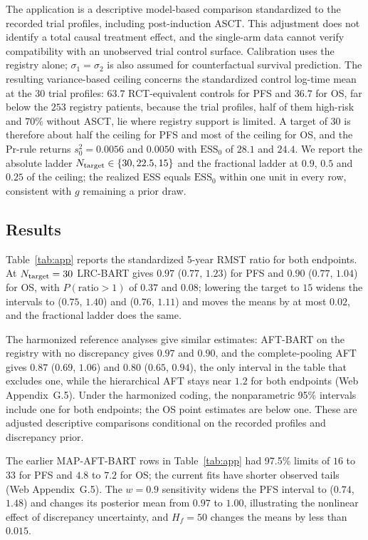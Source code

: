 The application is a descriptive model-based comparison standardized to the recorded trial profiles, including post-induction ASCT. This adjustment does not identify a total causal treatment effect, and the single-arm data cannot verify compatibility with an unobserved trial control surface. Calibration uses the registry alone; $\sigma_1=\sigma_2$ is also assumed for counterfactual survival prediction. The resulting variance-based ceiling concerns the standardized control log-time mean at the $30$ trial profiles: $63.7$ RCT-equivalent controls for PFS and $36.7$ for OS, far below the $253$ registry patients, because the trial profiles, half of them high-risk and $70\%$ without ASCT, lie where registry support is limited. A target of $30$ is therefore about half the ceiling for PFS and most of the ceiling for OS, and the Pr-rule returns $s_0^2=0.0056$ and $0.0050$ with $\mathrm{ESS}_0$ of $28.1$ and $24.4$. We report the absolute ladder $N_{\rm target}\in\{30,22.5,15\}$ and the fractional ladder at $0.9$, $0.5$ and $0.25$ of the ceiling; the realized ESS equals $\mathrm{ESS}_0$ within one unit in every row, consistent with $g$ remaining a prior draw.

\subsection{Results}
\label{sec:app_results}

Table~\ref{tab:app} reports the standardized 5-year RMST ratio for both endpoints. At $N_{\rm target}=30$ LRC-BART gives $0.97$ ($0.77$, $1.23$) for PFS and $0.90$ ($0.77$, $1.04$) for OS, with $P(\text{ratio}>1)$ of $0.37$ and $0.08$; lowering the target to $15$ widens the intervals to ($0.75$, $1.40$) and ($0.76$, $1.11$) and moves the means by at most $0.02$, and the fractional ladder does the same.

The harmonized reference analyses give similar estimates: AFT-BART on the registry with no discrepancy gives $0.97$ and $0.90$, and the complete-pooling AFT gives $0.87$ ($0.69$, $1.06$) and $0.80$ ($0.65$, $0.94$), the only interval in the table that excludes one, while the hierarchical AFT stays near $1.2$ for both endpoints (Web Appendix~G.5). Under the harmonized coding, the nonparametric 95\% intervals include one for both endpoints; the OS point estimates are below one. These are adjusted descriptive comparisons conditional on the recorded profiles and discrepancy prior.

The earlier MAP-AFT-BART rows in Table~\ref{tab:app} had 97.5\% limits of $16$ to $33$ for PFS and $4.8$ to $7.2$ for OS; the current fits have shorter observed tails (Web Appendix~G.5). The $w=0.9$ sensitivity widens the PFS interval to ($0.74$, $1.48$) and changes its posterior mean from $0.97$ to $1.00$, illustrating the nonlinear effect of discrepancy uncertainty, and $H_f=50$ changes the means by less than $0.015$.

